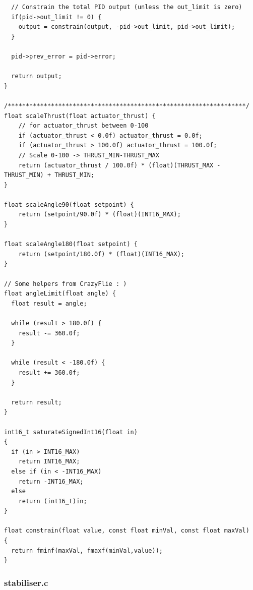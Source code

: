 \begin{lstlisting}
  // Constrain the total PID output (unless the out_limit is zero)
  if(pid->out_limit != 0) {
    output = constrain(output, -pid->out_limit, pid->out_limit);
  }

  pid->prev_error = pid->error;

  return output;
}

/******************************************************************/
float scaleThrust(float actuator_thrust) {
    // for actuator_thrust between 0-100
    if (actuator_thrust < 0.0f) actuator_thrust = 0.0f;
    if (actuator_thrust > 100.0f) actuator_thrust = 100.0f;
    // Scale 0-100 -> THRUST_MIN-THRUST_MAX
    return (actuator_thrust / 100.0f) * (float)(THRUST_MAX - THRUST_MIN) + THRUST_MIN;
}

float scaleAngle90(float setpoint) {
    return (setpoint/90.0f) * (float)(INT16_MAX);
}

float scaleAngle180(float setpoint) {
    return (setpoint/180.0f) * (float)(INT16_MAX);
}

// Some helpers from CrazyFlie : )
float angleLimit(float angle) {
  float result = angle;

  while (result > 180.0f) {
    result -= 360.0f;
  }

  while (result < -180.0f) {
    result += 360.0f;
  }

  return result;
}

int16_t saturateSignedInt16(float in)
{
  if (in > INT16_MAX)
    return INT16_MAX;
  else if (in < -INT16_MAX)
    return -INT16_MAX;
  else
    return (int16_t)in;
}

float constrain(float value, const float minVal, const float maxVal)
{
  return fminf(maxVal, fmaxf(minVal,value));
}
\end{lstlisting}

\pagebreak
\subsubsection{stabiliser.c}


